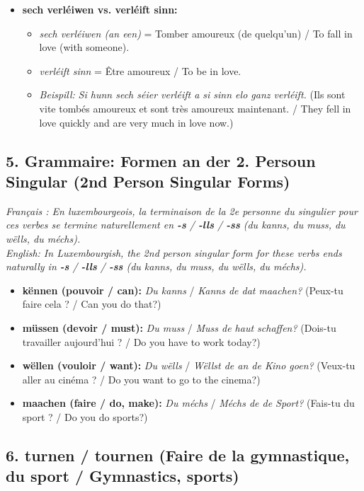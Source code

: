 \begin{itemize}
    \item \textbf{sech verléiwen vs. verléift sinn:}
    \begin{itemize}
        \item \textit{sech verléiwen (an een)} = Tomber amoureux (de quelqu'un) / To fall in love (with someone).
        \item \textit{verléift sinn} = Être amoureux / To be in love.
        \item \textit{Beispill:} \textit{Si hunn sech séier verléift a si sinn elo ganz verléift.} (Ils sont vite tombés amoureux et sont très amoureux maintenant. / They fell in love quickly and are very much in love now.)
    \end{itemize}
\end{itemize}

\subsection*{5. Grammaire: Formen an der 2. Persoun Singular (2nd Person Singular Forms)}

\noindent\textit{Français : En luxembourgeois, la terminaison de la 2e personne du singulier pour ces verbes se termine naturellement en \textbf{-s} / \textbf{-lls} / \textbf{-ss} (\textit{du kanns}, \textit{du muss}, \textit{du wëlls}, \textit{du méchs}).}\\
\textit{English: In Luxembourgish, the 2nd person singular form for these verbs ends naturally in \textbf{-s} / \textbf{-lls} / \textbf{-ss} (\textit{du kanns}, \textit{du muss}, \textit{du wëlls}, \textit{du méchs}).}

\begin{itemize}
    \item \textbf{kënnen (pouvoir / can):} \textit{Du kanns} / \textit{Kanns de dat maachen?} (Peux-tu faire cela ? / Can you do that?)
    \item \textbf{müssen (devoir / must):} \textit{Du muss} / \textit{Muss de haut schaffen?} (Dois-tu travailler aujourd'hui ? / Do you have to work today?)
    \item \textbf{wëllen (vouloir / want):} \textit{Du wëlls} / \textit{Wëllst de an de Kino goen?} (Veux-tu aller au cinéma ? / Do you want to go to the cinema?)
    \item \textbf{maachen (faire / do, make):} \textit{Du méchs} / \textit{Méchs de de Sport?} (Fais-tu du sport ? / Do you do sports?)
\end{itemize}

\subsection*{6. turnen / tournen (Faire de la gymnastique, du sport / Gymnastics, sports)}


